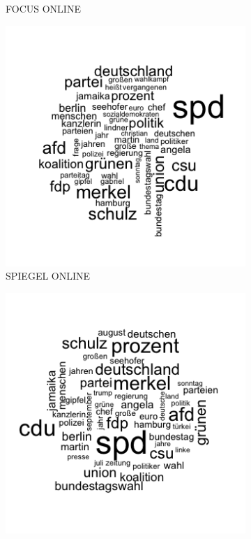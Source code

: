\documentclass[12pt,a4paper,notitlepage]{article}
\begin{document}
\begin{figure}[H]
\begin{center}
\begin{subfigure}[normla]{0.43\textwidth}
			\caption{FOCUS ONLINE}
		\end{subfigure}
		\begin{subfigure}[normla]{0.43\textwidth}
			\includegraphics[width=\textwidth]{figs/wordcloud_SPIEGELONLINE.png}
			\caption{SPIEGEL ONLINE}
		\end{subfigure}
		\begin{subfigure}[normla]{0.43\textwidth}
			\includegraphics[width=\textwidth]{figs/wordcloud_stern.png}

\end{subfigure}
\end{center}
\end{figure}
\end{document}
